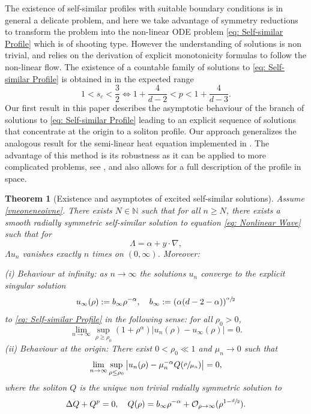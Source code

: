 \documentclass[JEP,XML,SOM,Unicode]{cedram}
\theoremstyle{plain}
\newtheorem{theorem}{Theorem}
\theoremstyle{definition}
\begin{document}
The existence of self-similar profiles with suitable boundary conditions is in general a delicate problem, and here we take advantage of symmetry reductions to transform the problem into the non-linear ODE problem \eqref{eq: Self-similar Profile} which is of shooting type. However the understanding of solutions is non trivial, and relies on the derivation of explicit monotonicity formulas to follow the non-linear flow. The existence of a countable family of solutions to \eqref{eq: Self-similar Profile} is obtained in \cite{BMW,DD} in the expected range
\begin{equation}
\label{vneoneneoivne}
1<s_c<\frac{3}{2}\iff 1+\frac{4}{d-2}<p<1+\frac{4}{d-3}.
\end{equation}
Our first result in this paper describes the asymptotic behaviour of the branch of solutions to \eqref{eq: Self-similar Profile} leading to an explicit sequence of solutions that concentrate at the origin to a soliton profile. Our approach generalizes the analogous result for the semi-linear heat equation implemented in \cite{BB,CRS}. The advantage of this method is its robustness as it can be applied to more complicated problems, see \eg \cite{BMR}, and also allows for a full description of the profile in space.

\begin{theorem}[Existence and asymptotes of excited self-similar solutions]
\label{theo: Result 1}
Assume \eqref{vneoneneoivne}. There exists $N\in\mathbb N$ such that for all $n\ge N$, there exists a smooth radially symmetric self-similar solution to equation \eqref{eq: Nonlinear Wave} such that for
\[
\Lambda = \alpha+y\cdot \nabla,
\]
$\Lambda u_n$ vanishes exactly $n$ times on $(0,\infty)$. Moreover:

\emph{(i) Behaviour at infinity:} as $n\to \infty$ the solutions $u_n$ converge to the explicit singular solution
\[
u_\infty(\rho):=b_\infty\rho^{-\alpha}, \quad b_\infty:=(\alpha(d-2-\alpha))^{\sfrac{\alpha}{2}}
\]
to \eqref{eq: Self-similar Profile} in the following sense: for all $\rho_0>0$,
\[
\lim_{n\to \infty }\sup_{\rho\ge\rho_0}(1+\rho^\alpha)|u_n(\rho)-u_\infty(\rho)|=0.
\]
\emph{(ii) Behaviour at the origin:} There exist $0<\rho_0\ll1 $ and $\mu_n\to 0$ such that
\[
\lim_{n\to \infty }\sup_{\rho\le\rho_0}\big|u_n(\rho)-\mu_n^{-\alpha}Q(\sfrac{\rho}{\mu_n})\big|=0,
\]
where the soliton $Q$ is the unique non trivial radially symmetric solution to
\[
\Delta Q+Q^p=0,\quad Q(\rho)=b_\infty\rho^{-\alpha}+\mathcal O_{\rho\to\infty } (\rho^{1-\sfrac{d}{2}}).
\]
\end{theorem}
\end{document}
